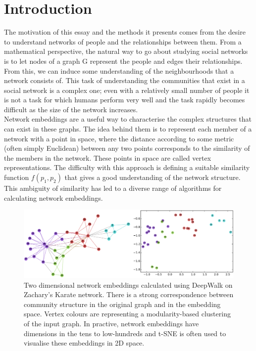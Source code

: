 \documentclass[a4paper]{article}
\begin{document}


\tableofcontents

\section{Introduction}
The motivation of this essay and the methods it presents comes from the desire to understand networks of people and the relationships between them.
From a mathematical perspective, the natural way to go about studying social networks is to let nodes of a graph G represent the people and edges their relationships. From this, we can induce some understanding of the neighbourhoods that a network consists of. This task of understanding the communities that exist in a social network is a complex one; even with a relatively small number of people it is not a task for which humans perform very well and the task rapidly becomes difficult as the size of the network increases.\\
Network embeddings are a useful way to characterise the complex structures that
can exist in these graphs. The idea behind them is to represent each member of a
network with a point in space, where the distance according to some metric
(often simply Euclidean) between any two points corresponds to the similarity of
the members in the network. These points in space are called vertex
representations. The difficulty with this approach is defining a suitable
similarity function $f(p_1,p_2)$ that gives a good understanding of the network
structure. This ambiguity of similarity has led to a diverse range of algorithms for calculating network embeddings.
\begin{figure}[h!]
  \centering
  \includegraphics[width = 1\textwidth]{src/DeepWalkOnKarateGraph.png}

  \caption{Two dimensional network embeddings calculated using
    DeepWalk\cite{deepwalk} on Zachary's Karate network\cite{zachary1977}. There is a strong
    correspondence between community structure in the original graph and
    in the embedding space. Vertex colours are representing a modularity-based
    clustering of the input graph. In practive, network embeddings have dimensions
    in the tens to low-hundreds and t-SNE\cite{maaten2008} is often used to visualise these embeddings in 2D
    space.}
\end{figure}\\
\end{document}
